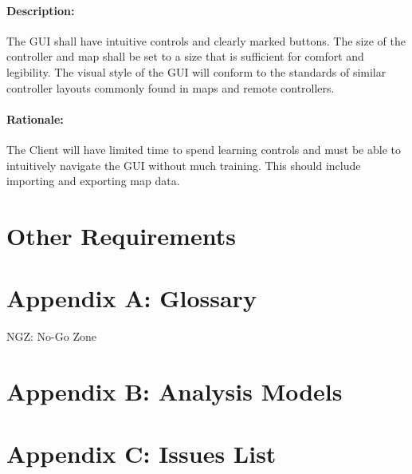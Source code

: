 \documentclass[10pt,a4paper,titlepage]{article}
\begin{document}
	\paragraph {Description:} The GUI shall have intuitive controls and clearly marked buttons. The size of the controller and map shall be set to a size that is sufficient for comfort and legibility. The visual style of the GUI will conform to the standards of similar controller layouts commonly found in maps and remote controllers.\\
	\paragraph {Rationale:} The Client will have limited time to spend learning controls and must be able to intuitively navigate the GUI without much training. This should include importing and exporting map data.\\
	
	\section{Other Requirements}
	
	\section{Appendix A: Glossary}
	NGZ: No-Go Zone
	
	\section{Appendix B: Analysis Models}
	
	\section{Appendix C: Issues List}
	
\end{document}
